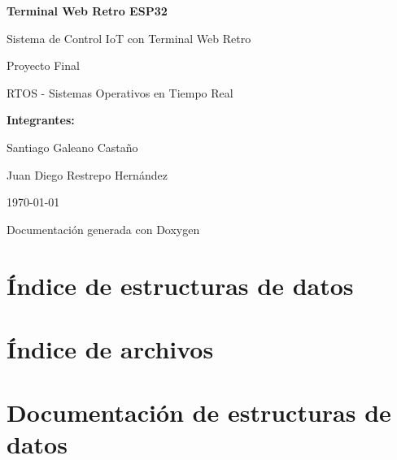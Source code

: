 \hypersetup{
    colorlinks=true,
    linkcolor=blue,
    urlcolor=blue,
    citecolor=blue
}
\newpage
\thispagestyle{empty}
\begin{center}
    {\Huge\bfseries Terminal Web Retro ESP32\par}
    \vspace{1cm}
    {\Large Sistema de Control IoT con Terminal Web Retro\par}
    \vspace{2cm}
    {\large Proyecto Final\par}
    {\large RTOS - Sistemas Operativos en Tiempo Real\par}
    \vspace{2cm}
    {\large\bfseries Integrantes:\par}
    \vspace{1cm}
    {\large Santiago Galeano Castaño\par}
    \vspace{0.5cm}
    {\large Juan Diego Restrepo Hernández\par}
    \vspace{3cm}
    {\large \today\par}
    \vfill
    {\small Documentación generada con Doxygen\par}
\end{center}
\newpage
\thispagestyle{plain}

\chapter{Índice de estructuras de datos}

\chapter{Índice de archivos}

\chapter{Documentación de estructuras de datos}








